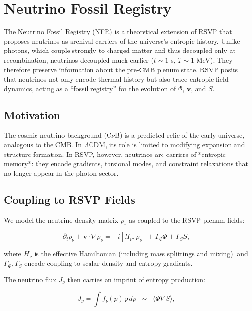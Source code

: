\documentclass[12pt]{report}
\begin{document}
\chapter{Neutrino Fossil Registry}

The Neutrino Fossil Registry (NFR) is a theoretical extension of RSVP that proposes neutrinos as archival carriers of the universe’s entropic history. Unlike photons, which couple strongly to charged matter and thus decoupled only at recombination, neutrinos decoupled much earlier ($t \sim 1$ s, $T \sim 1$ MeV). They therefore preserve information about the pre-CMB plenum state. RSVP posits that neutrinos not only encode thermal history but also trace entropic field dynamics, acting as a “fossil registry” for the evolution of $\Phi$, $\mathbf{v}$, and $S$.

\section{Motivation}

The cosmic neutrino background (C$\nu$B) is a predicted relic of the early universe, analogous to the CMB. In $\Lambda$CDM, its role is limited to modifying expansion and structure formation. In RSVP, however, neutrinos are carriers of *entropic memory*: they encode gradients, torsional modes, and constraint relaxations that no longer appear in the photon sector.

\section{Coupling to RSVP Fields}

We model the neutrino density matrix $\rho_\nu$ as coupled to the RSVP plenum fields:

\begin{equation}
\partial_t \rho_\nu + \mathbf{v}\cdot\nabla \rho_\nu = 
-i[H_\nu, \rho_\nu] + \Gamma_\Phi \Phi + \Gamma_S S,
\label{eq:neutrino-evolution}
\end{equation}

where $H_\nu$ is the effective Hamiltonian (including mass splittings and mixing), and $\Gamma_\Phi,\Gamma_S$ encode coupling to scalar density and entropy gradients. 

The neutrino flux $J_\nu$ then carries an imprint of entropy production:

\begin{equation}
J_\nu = \int f_\nu(p)\, p \, dp 
\;\;\sim\;\; \langle \Phi \nabla S \rangle,
\label{eq:neutrino-flux}
\end{equation}
\end{document}
